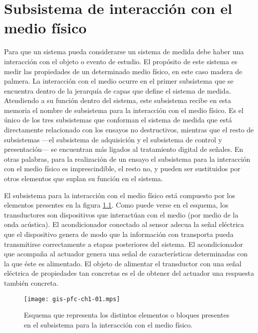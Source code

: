 \chapter{Subsistema de interacción con el medio físico}

Para que un sistema pueda considerarse un sistema de medida debe haber una
interacción con el objeto o evento de estudio. El propósito de este sistema
es medir las propiedades de un determinado medio físico, en este caso
madera de palmera. La interacción con el medio ocurre en el primer
subsistema que se encuentra dentro de la jerarquía de capas que define el
sistema de medida. Atendiendo a su función dentro del sistema, este
subsistema recibe en esta memoria el nombre de subsistema para la
interacción con el medio físico. Es el único de los tres subsistemas que
conforman el sistema de medida que está directamente relacionado con los
ensayos no destructivos, mientras que el resto de subsistemas ---el
subsistema de adquisición y el subsistema de control y presentación--- se
encuentran más ligados al tratamiento digital de señales. En otras
palabras, para la realización de un ensayo el subsistema para la
interacción con el medio físico es imprescindible, el resto no, y pueden
ser sustituidos por otros elementos que suplan su función en el sistema.

El subsistema para la interacción con el medio físico está compuesto por
los elementos presentes en la figura \cref{fig:submedium}. Como puede verse
en el esquema, los transductores son dispositivos que interactúan con el
medio (por medio de la onda acústica). El acondicionador conectado al
sensor adecua la señal eléctrica que el dispositivo genera de modo que la
información con transporta pueda transmitirse correctamente a etapas
posteriores del sistema. El acondicionador que acompaña al actuador genera
una señal de características determinadas con la que éste es alimentado. El
objeto de alimentar el transductor con una señal eléctrica de propiedades
tan concretas es el de obtener del actuador una respuesta también concreta.

\begin{figure}
	\begin{center}
		\texttt{[image: gis-pfc-ch1-01.mps]}
	\end{center}
	\caption[Subsistema para la interacción del medio físico]{Esquema
	que representa los distintos elementos o bloques presentes en el
	subsistema para la interacción con el medio físico.}
	\label{fig:submedium}
\end{figure}

